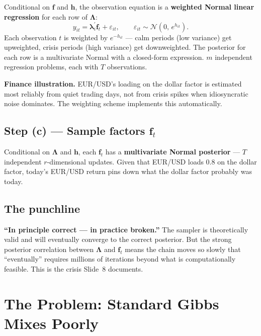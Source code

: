 \documentclass[11pt, a4paper]{article}\usepackage[]{graphicx}\usepackage[]{xcolor}
\newcommand{\stress}[1]{\textbf{#1}}
\begin{document}
Conditional on $\mathbf{f}$ and $\mathbf{h}$, the observation equation is a
\stress{weighted Normal linear regression} for each row of
$\boldsymbol{\Lambda}$:
\[
  y_{it} = \boldsymbol{\lambda}_i^\prime \mathbf{f}_t + \varepsilon_{it},
  \qquad
  \varepsilon_{it} \sim \mathcal{N}(0,\, e^{h_{it}}).
\]
Each observation $t$ is weighted by $e^{-h_{it}}$ --- calm periods
(low variance) get upweighted, crisis periods (high variance) get
downweighted.  The posterior for each row is a multivariate Normal with a
closed-form expression.  $m$ independent regression problems, each with $T$
observations.

\textbf{Finance illustration.}  EUR/USD's loading on the dollar factor is
estimated most reliably from quiet trading days, not from crisis spikes when
idiosyncratic noise dominates.  The weighting scheme implements this
automatically.

\subsection{Step (c) --- Sample factors $\mathbf{f}_t$}

Conditional on $\boldsymbol{\Lambda}$ and $\mathbf{h}$, each $\mathbf{f}_t$
has a \stress{multivariate Normal posterior} --- $T$ independent
$r$-dimensional updates.  Given that EUR/USD loads 0.8 on the dollar factor,
today's EUR/USD return pins down what the dollar factor probably was today.

\subsection{The punchline}

\begin{remarkbox}
  \textbf{``In principle correct --- in practice broken.''}
  The sampler is theoretically valid and will eventually converge to the
  correct posterior.  But the strong posterior correlation between
  $\boldsymbol{\Lambda}$ and $\mathbf{f}_t$ means the chain moves so slowly
  that ``eventually'' requires millions of iterations beyond what is
  computationally feasible.  This is the crisis Slide~8 documents.
\end{remarkbox}

\section{The Problem: Standard Gibbs Mixes Poorly}
\end{document}
